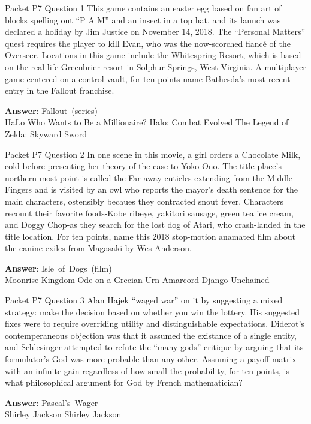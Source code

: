 \begin{frame}{Packet P7 Question 1}
This game contains an easter egg based on fan art of blocks spelling out ``P A M'' and an insect in a top hat, and its launch was declared a holiday by Jim Justice on November 14, 2018.  The ``Personal Matters'' quest requires the player to kill Evan, who was the now-scorched fiancé of the Overseer.  Locations in this game include the Whitespring Resort, which is based on the real-life Greenbrier resort in Solphur Springs, West Virginia.  A multiplayer game centered on a control vault, for ten points name Bathesda's most recent entry in the Fallout franchise.         

\textbf{Answer}: Fallout\ (series)\\
 HaLo
 Who Wants to Be a Millionaire?
 Halo: Combat Evolved
 The Legend of Zelda: Skyward Sword
\end{frame}

\begin{frame}{Packet P7 Question 2}
In one scene in this movie, a girl orders a Chocolate Milk, cold before presenting her theory of the case to Yoko Ono.  The title place's northern most point is called the Far-away cuticles extending from the Middle Fingers and is visited by an owl who reports the  mayor's death sentence for the main characters, ostensibly becaues they contracted snout fever.  Characters recount their favorite foods-Kobe ribeye, yakitori sausage, green tea ice cream, and Doggy Chop-as they search for the lost dog of Atari, who crash-landed in the title location.  For ten points, name this 2018 stop-motion anamated film about the canine exiles from Magasaki by Wes Anderson.           

\textbf{Answer}: Isle\ of\ Dogs\ (film)\\
 Moonrise Kingdom
 Ode on a Grecian Urn
 Amarcord
 Django Unchained
\end{frame}

\begin{frame}{Packet P7 Question 3}
Alan Hajek ``waged war'' on it by suggesting a mixed strategy: make the decision based on whether you win the lottery.  His   suggested fixes were to require overriding utility and distinguishable expectations.  Diderot's contemperaneous objection was that it assumed the existance of a single entity, and Schlesinger attempted to refute the ``many gods'' critique by arguing that its formulator's   God was more probable than any other.  Assuming a payoff matrix with an infinite gain regardless of how small the probability, for   ten points, is what philosophical argument for God by French   mathematician?  

\textbf{Answer}: Pascal's\ Wager\\
 Shirley Jackson
 Shirley Jackson
\end{frame}

